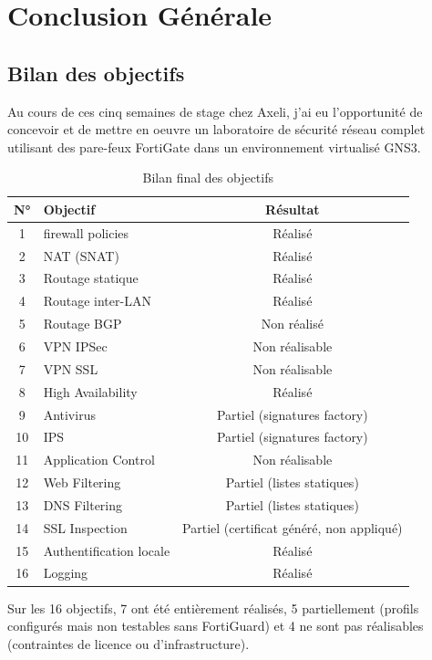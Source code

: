 \chapter{Conclusion Générale}
\label{chap:conclusion}

\section{Bilan des objectifs}

Au cours de ces cinq semaines de stage chez Axeli, j'ai eu l'opportunité de concevoir et de mettre en oeuvre un laboratoire de sécurité réseau complet utilisant des pare-feux FortiGate dans un environnement virtualisé GNS3.

\begin{table}[H]
\centering
\caption{Bilan final des objectifs}
\label{tab:bilan}
\begin{tabularx}{\textwidth}{|c|X|c|}
\hline
\textbf{N°} & \textbf{Objectif} & \textbf{Résultat} \\
\hline
1 & firewall policies & Réalisé \\
2 & NAT (SNAT) & Réalisé \\
3 & Routage statique & Réalisé \\
4 & Routage inter-LAN & Réalisé \\
5 & Routage BGP & Non réalisé \\
6 & VPN IPSec & Non réalisable \\
7 & VPN SSL & Non réalisable \\
8 & High Availability & Réalisé \\
9 & Antivirus & Partiel (signatures factory) \\
10 & IPS & Partiel (signatures factory) \\
11 & Application Control & Non réalisable \\
12 & Web Filtering & Partiel (listes statiques) \\
13 & DNS Filtering & Partiel (listes statiques) \\
14 & SSL Inspection & Partiel (certificat généré, non appliqué) \\
15 & Authentification locale & Réalisé \\
16 & Logging & Réalisé \\
\hline
\end{tabularx}
\end{table}

Sur les 16 objectifs, 7 ont été entièrement réalisés, 5 partiellement (profils configurés mais non testables sans FortiGuard) et 4 ne sont pas réalisables (contraintes de licence ou d'infrastructure).


